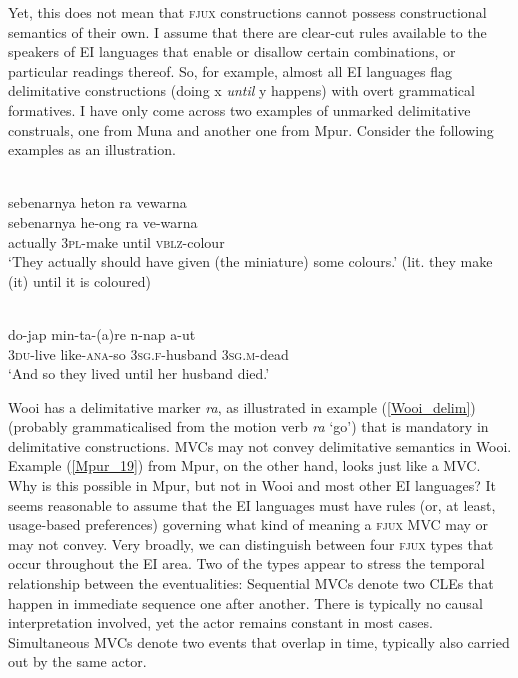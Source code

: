 Yet, this does not mean that \textsc{fjux} constructions cannot possess constructional semantics of their own. I assume that there are clear-cut rules available to the speakers of EI languages that enable or disallow certain combinations, or particular readings thereof. So, for example, almost all EI languages flag delimitative constructions (doing x \textit{until} y happens) with overt grammatical formatives. I have only come across two examples of unmarked delimitative construals, one from Muna and another one from Mpur. Consider the following examples as an illustration. 

\ea \label{Wooi_delim}
\\
\glll sebenarnya heton ra vewarna \\
sebenarnya he-ong ra ve-warna \\
actually 3\textsc{pl}-make until \textsc{vblz}-colour \\
\glft `They actually should have given (the miniature) some colours.' (lit. they make (it) until it is coloured)\\ 
\z

\ea \label{Mpur_19}
\\
\gll do-jap min-ta-(a)re n-nap a-ut \\
3\textsc{du}-live like-\textsc{ana}-so 3\textsc{sg}.\textsc{f}-husband 3\textsc{sg}.\textsc{m}-dead \\
\glft `And so they lived until her husband died.'\\ 
\z

Wooi has a delimitative marker \textit{ra}, as illustrated in example (\ref{Wooi_delim}) (probably grammaticalised from the motion verb \textit{ra} `go') that is mandatory in delimitative constructions. MVCs may not convey delimitative semantics in Wooi. Example (\ref{Mpur_19}) from Mpur, on the other hand, looks just like a MVC. Why is this possible in Mpur, but not in Wooi and most other EI languages? It seems reasonable to assume that the EI languages must have rules (or, at least, usage-based preferences) governing what kind of meaning a \textsc{fjux} MVC may or may not convey. Very broadly, we can distinguish between four \textsc{fjux} types that occur throughout the EI area. Two of the types appear to stress the temporal relationship between the eventualities: Sequential MVCs denote two CLEs that happen in immediate sequence one after another. There is typically no causal interpretation involved, yet the actor remains constant in most cases. Simultaneous MVCs denote two events that overlap in time, typically also carried out by the same actor. 

